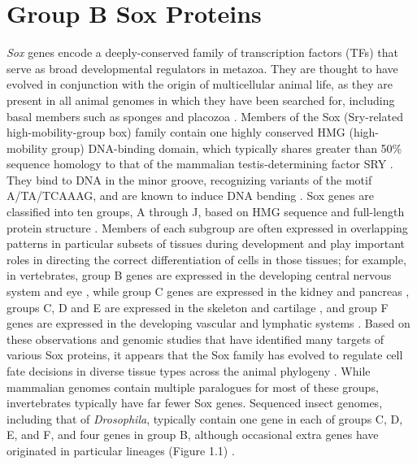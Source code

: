 \section{Group B Sox Proteins}
\emph{Sox} genes encode a deeply-conserved family of transcription factors (TFs) that serve as broad developmental regulators in metazoa. They are thought to have evolved in conjunction with the origin of multicellular animal life, as they are present in all animal genomes in which they have been searched for, including basal members such as sponges and placozoa \citep{jager_expansion_2006,jager_insights_2008,larroux_developmental_2006,phochanukul_no_2010,srivastava_trichoplax_2008}. Members of the Sox (Sry-related high-mobility-group box) family contain one highly conserved HMG (high-mobility group) DNA-binding domain, which typically shares greater than 50\% sequence homology to that of the mammalian testis-determining factor SRY \citep{bowles_phylogeny_2000,guth_having_2008,phochanukul_no_2010,sinclair_gene_1990}. They bind to DNA in the minor groove, recognizing variants of the motif A/TA/TCAAAG, and are known to induce DNA bending \citep{bowles_phylogeny_2000,ferrari_sry_1992,giese_hmg_1992}. Sox genes are classified into ten groups, A through J, based on HMG sequence and full-length protein structure \citep{schepers_twenty_2002}. Members of each subgroup are often expressed in overlapping patterns in particular subsets of tissues during development and play important roles in directing the correct differentiation of cells in those tissues; for example, in vertebrates, group B genes are expressed in the developing central nervous system and eye \citep{bergsland_sequentially_2011,kamachi_involvement_1998,uwanogho_embryonic_1995,wood_comparative_1999}, while group C genes are expressed in the kidney and pancreas \citep{huang_transcription_2013,sock_gene_2004,wilson_hmg_2005}, groups C, D and E are expressed in the skeleton and cartilage \citep{akiyama_transcription_2002,smits_transcription_????}, and group F genes are expressed in the developing vascular and lymphatic systems \citep{downes_sox18_????,matsui_redundant_2006}. Based on these observations and genomic studies that have identified many targets of various Sox proteins, it appears that the Sox family has evolved to regulate cell fate decisions in diverse tissue types across the animal phylogeny \citep{lefebvre_control_2007,whyte_master_2013}. While mammalian genomes contain multiple paralogues for most of these groups, invertebrates typically have far fewer Sox genes. Sequenced insect genomes, including that of \emph{Drosophila}, typically contain one gene in each of groups C, D, E, and F, and four genes in group B, although occasional extra genes have originated in particular lineages (Figure 1.1) \citep{bowles_phylogeny_2000,phochanukul_no_2010}.

